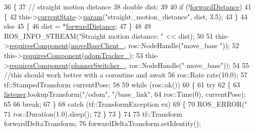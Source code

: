 \begin{DoxyCode}
36     \{
37         \textcolor{comment}{// straight motion distance}
38         \textcolor{keywordtype}{double} dist;
39 
40         \textcolor{keywordflow}{if} (!\hyperlink{classSbNavigateForward_adc99629f937c3d43fa56a59ca16f9aee}{forwardDistance})
41         \{
42             this->\hyperlink{classsmacc_1_1SmaccSubStateBehavior_a62e2b9da4a446f09396d0b4c01659b88}{currentState}->\hyperlink{classsmacc_1_1ISmaccState_a4982f2187ed6da337462721146e8ef70}{param}(\textcolor{stringliteral}{"straight\_motion\_distance"}, dist, 3.5);
43         \}
44         \textcolor{keywordflow}{else}
45         \{
46             dist = *\hyperlink{classSbNavigateForward_adc99629f937c3d43fa56a59ca16f9aee}{forwardDistance};
47         \}
48 
49         ROS\_INFO\_STREAM(\textcolor{stringliteral}{"Straight motion distance: "} << dist);
50 
51         this->\hyperlink{classsmacc_1_1SmaccSubStateBehavior_a4d25c4ba8ec01c489df172a71bb1c37d}{requiresComponent}(\hyperlink{classSbNavigateForward_a6c3b305bdf4a637dad4d80b456575a36}{moveBaseClient\_}, ros::NodeHandle(\textcolor{stringliteral}{"move\_base
      "}));
52         this->\hyperlink{classsmacc_1_1SmaccSubStateBehavior_a4d25c4ba8ec01c489df172a71bb1c37d}{requiresComponent}(\hyperlink{classSbNavigateForward_ac45353a2cfde3c3d2c802065ed1419fc}{odomTracker\_});
53         this->\hyperlink{classsmacc_1_1SmaccSubStateBehavior_a4d25c4ba8ec01c489df172a71bb1c37d}{requiresComponent}(\hyperlink{classSbNavigateForward_afdb6dba7135fa431ef14bf7a7b6cee09}{plannerSwitcher\_}, ros::NodeHandle(\textcolor{stringliteral}{"
      move\_base"}));
54 
55         \textcolor{comment}{//this should work better with a coroutine and await}
56         ros::Rate rate(10.0);
57         tf::StampedTransform currentPose;
58 
59         \textcolor{keywordflow}{while} (ros::ok())
60         \{
61             \textcolor{keywordflow}{try}
62             \{
63                 \hyperlink{classSbNavigateForward_acdf8c63e8a81587ef0b419c94e3b6a4d}{listener}.lookupTransform(\textcolor{stringliteral}{"/odom"}, \textcolor{stringliteral}{"/base\_link"}, 
64                                          ros::Time(0), currentPose);
65 
66                 \textcolor{keywordflow}{break};
67             \}
68             \textcolor{keywordflow}{catch} (tf::TransformException ex)
69             \{
70                 ROS\_ERROR(\textcolor{stringliteral}{"%
71                 ros::Duration(1.0).sleep();
72             \}
73         \}
74 
75         tf::Transform forwardDeltaTransform;
76         forwardDeltaTransform.setIdentity();
}
\end{DoxyCode}
